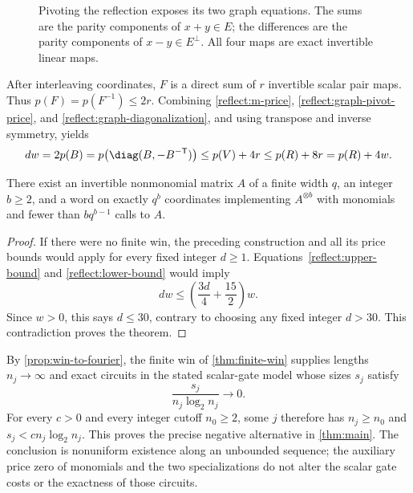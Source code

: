 \begin{figure}[ht]
\centering
{}
\caption{Pivoting the reflection exposes its two graph equations.
The sums are the parity components of $x+y\in E$; the differences
are the parity components of $x-y\in E^\perp$.
All four maps are exact invertible linear maps.}
\label{reflect:graph-figure}
\end{figure}

After interleaving coordinates, $F$ is a direct sum of $r$ invertible
scalar pair maps.  Thus $p(F)=p(F^{-1})\leq2r$.
Combining \eqref{reflect:m-price},
\eqref{reflect:graph-pivot-price}, and
\eqref{reflect:graph-diagonalization}, and using transpose and
inverse symmetry, yields
\begin{equation}
 dw=2p(B)
    =p\bigl(\diag(B,-B^{-\mathsf T})\bigr)
    \leq p(V)+4r
    \leq p(R)+8r
    =p(R)+4w.
 \label{reflect:lower-bound}
\end{equation}

\begin{theorem}
\label{thm:finite-win}
There exist an invertible nonmonomial matrix $A$ of a finite width
$q$, an integer $b\geq2$, and a word on exactly $q^b$ coordinates
implementing $A^{\otimes b}$ with monomials and fewer than
$bq^{b-1}$ calls to $A$.
\end{theorem}

\begin{proof}
If there were no finite win, the preceding construction and all its
price bounds would apply for every fixed integer $d\geq1$.
Equations~\eqref{reflect:upper-bound} and
\eqref{reflect:lower-bound} would imply
\[
 dw\leq\left(\frac{3d}{4}+\frac{15}{2}\right)w.
\]
Since $w>0$, this says $d\leq30$, contrary to choosing any fixed
integer $d>30$.  This contradiction proves the theorem.
\end{proof}

By \cref{prop:win-to-fourier}, the finite win of
\cref{thm:finite-win} supplies lengths $n_j\to\infty$ and exact
circuits in the stated scalar-gate model whose sizes $s_j$ satisfy
\[
 \frac{s_j}{n_j\log_2 n_j}\longrightarrow0.
\]
For every $c>0$ and every integer cutoff $n_0\geq2$, some $j$
therefore has $n_j\geq n_0$ and $s_j<c n_j\log_2 n_j$.
This proves the precise negative alternative in \cref{thm:main}.
The conclusion is nonuniform existence along an unbounded sequence;
the auxiliary price zero of monomials and the two specializations do
not alter the scalar gate costs or the exactness of those circuits.


